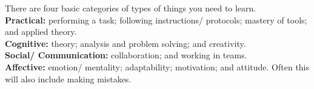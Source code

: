 

There are four basic categories of types of things you need to learn.\\

\textbf{Practical:} performing a task; following instructions/ protocols; mastery of tools; and applied theory.\\

\textbf{Cognitive:} theory; analysis and problem solving; and creativity.\\

\textbf{Social/ Communication:} collaboration; and working in teams.\\

\textbf{Affective:} emotion/ mentality; adaptability; motivation; and attitude. Often this will also include making mistakes.